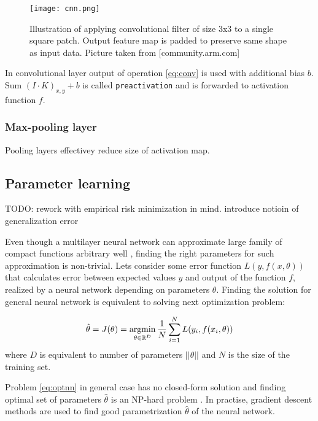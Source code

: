\begin{figure}
  \texttt{[image: cnn.png]}
  \caption{Illustration of applying convolutional filter of size 3x3 to a single square patch. Output feature map is padded to preserve same shape as input data. Picture taken from [community.arm.com]}
  \label{fig:cnn}
\end{figure}

In convolutional layer output of operation \ref{eq:conv} is used with additional bias $b$.
Sum $(I \cdot K)_{x, y}+b$ is called \texttt{preactivation} and is forwarded to activation function $f$.

\subsubsection{Max-pooling layer}

Pooling layers effectivey reduce size of activation map.


\subsection{Parameter learning}
\label{ch:opt}

TODO: rework with empirical risk minimization in mind. introduce notioin of generalization error

Even though a multilayer neural network can approximate large family of compact functions arbitrary well \cite{Debao1993}, finding the right parameters for such approximation is non-trivial.
Lets consider some error function $L(y, f(x, \theta))$ that calculates error between expected values $y$ and output of the function $f$, realized by a neural network depending on parameters $\theta$. Finding the solution for general neural network is equivalent to solving next optimization problem:

\begin{equation}\label{eq:optnn}
  \hat{\theta} = J(\theta) = \operatorname*{argmin}_{\theta \in \Bbb{R}^D} \frac{1}{N} \sum_{i=1}^{N} L(y_i, f(x_i, \theta))
\end{equation}
where $D$ is equivalent to number of parameters $||\theta||$ and $N$ is the size of the training set.

Problem \ref{eq:optnn} in general case has no closed-form solution and finding optimal set of parameters $\hat{\theta}$ is an NP-hard problem \cite{Anandkumar16}.
In practise, gradient descent methods are used to find good parametrization $\hat{\theta}$ of the neural network.

